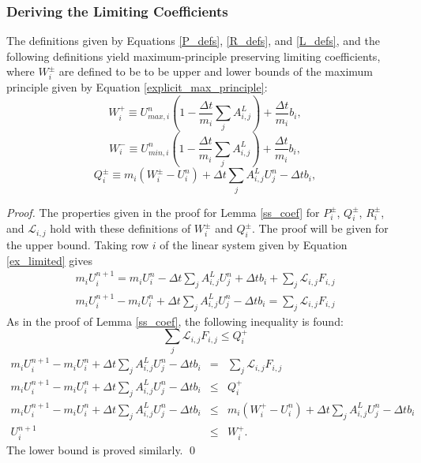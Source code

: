 \subsubsection{Deriving the Limiting Coefficients}
\begin{lemma}
   The definitions given by Equations \ref{P_defs}, \ref{R_defs}, and \ref{L_defs},
   and the following definitions yield maximum-principle preserving limiting coefficients,
   where $W_i^\pm$ are defined to be to be upper and lower bounds of the maximum
   principle given by Equation \ref{explicit_max_principle}:
   \begin{equation}
      W_i^+ \equiv U_{max,i}^n\left(1-\frac{\Delta t}{m_i}\sum\limits_j A^L_{i,j}\right)
      + \frac{\Delta t}{m_i}b_i,
   \end{equation}
   \begin{equation}
      W_i^- \equiv U_{min,i}^n\left(1-\frac{\Delta t}{m_i}\sum\limits_j A^L_{i,j}\right)
      + \frac{\Delta t}{m_i}b_i,
   \end{equation}
   \begin{equation}
      Q_i^\pm \equiv m_i(W_i^\pm-U_i^n) + \Delta t\sum\limits_j A_{i,j}^L U_j^n
         - \Delta t b_i,
   \end{equation}
\end{lemma}

\begin{proof}
   The properties given in the proof for Lemma \ref{ss_coef} for $P_i^\pm$,
   $Q_i^\pm$, $R_i^\pm$, and $\mathcal{L}_{i,j}$ hold with these definitions
   of $W_i^\pm$ and $Q_i^\pm$.
   The proof will be given for the upper bound. 
   Taking row $i$ of the linear system given by Equation \ref{ex_limited} gives
   \begin{gather*}
      m_i U_i^{n+1} = m_i U_i^n - \Delta t\sum\limits_j A_{i,j}^L U_j^n + \Delta t b_i
         + \sum\limits_j \mathcal{L}_{i,j}F_{i,j}\\
      m_i U_i^{n+1} - m_i U_i^n + \Delta t\sum\limits_j A_{i,j}^L U_j^n - \Delta t b_i
         = \sum\limits_j \mathcal{L}_{i,j}F_{i,j}
   \end{gather*}
   As in the proof of Lemma \ref{ss_coef}, the following inequality is found:
   \[
      \sum\limits_j \mathcal{L}_{i,j}F_{i,j} \leq Q_i^+
   \]
   \begin{eqnarray*}
      m_i U_i^{n+1} - m_i U_i^n + \Delta t\sum\limits_j A_{i,j}^L U_j^n - \Delta t b_i
      & = & \sum\limits_j \mathcal{L}_{i,j}F_{i,j}\\
      m_i U_i^{n+1} - m_i U_i^n + \Delta t\sum\limits_j A_{i,j}^L U_j^n - \Delta t b_i
      & \leq & Q_i^+\\
      m_i U_i^{n+1} - m_i U_i^n + \Delta t\sum\limits_j A_{i,j}^L U_j^n - \Delta t b_i
      & \leq & m_i(W_i^+-U_i^n) + \Delta t\sum\limits_j A_{i,j}^L U_j^n
         - \Delta t b_i\\
      U_i^{n+1} & \leq & W_i^+.
   \end{eqnarray*}
   The lower bound is proved similarly.
   \qed
\end{proof}